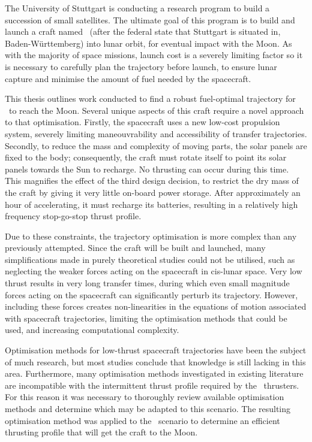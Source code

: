
\vfill

The University of Stuttgart is conducting a research program to build a succession of small satellites. The ultimate goal of this program is to build and launch a craft named \BW\ (after the federal state that Stuttgart is situated in, Baden-W\"{u}rttemberg) into lunar orbit, for eventual impact with the Moon. As with the majority of space missions, launch cost is a severely limiting factor so it is necessary to carefully plan the trajectory before launch, to ensure lunar capture and minimise the amount of fuel needed by the spacecraft.

This thesis outlines work conducted to find a robust fuel-optimal trajectory for \BW\ to reach the Moon. Several unique aspects of this craft require a novel approach to that optimisation. Firstly, the spacecraft uses a new low-cost propulsion system, severely limiting maneouvrability and accessibility of transfer trajectories. Secondly, to reduce the mass and complexity of moving parts, the solar panels are fixed to the body; consequently, the craft must rotate itself to point its solar panels towards the Sun to recharge. No thrusting can occur during this time. This magnifies the effect of the third design decision, to restrict the dry mass of the craft by giving it very little on-board power storage. After approximately an hour of accelerating, it must recharge its batteries, resulting in a relatively high frequency stop-go-stop thrust profile.

Due to these constraints, the trajectory optimisation is more complex than any previously attempted. Since the craft will be built and launched, many simplifications made in purely theoretical studies could not be utilised, such as neglecting the weaker forces acting on the spacecraft in cis-lunar space. Very low thrust results in very long transfer times, during which even small magnitude forces acting on the spacecraft can significantly perturb its trajectory. However, including these forces creates non-linearities in the equations of motion associated with spacecraft trajectories, limiting the optimisation methods that could be used, and increasing computational complexity.

Optimisation methods for low-thrust spacecraft trajectories have been the subject of much research, but most studies conclude that knowledge is still lacking in this area. Furthermore, many optimisation methods investigated in existing literature are incompatible with the intermittent thrust profile required by the \BW\ thrusters. For this reason it was necessary to thoroughly review available optimisation methods and determine which may be adapted to this scenario. The resulting optimisation method was applied to the \BW\ scenario to determine an efficient thrusting profile that will get the craft to the Moon.

